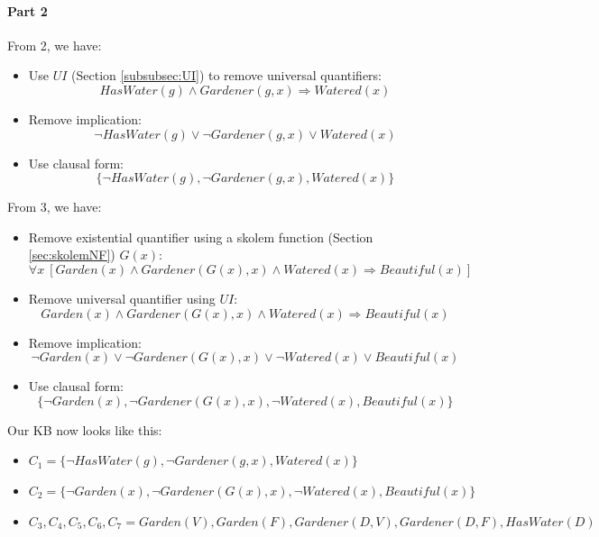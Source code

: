 \documentclass[10pt,a4paper]{article}
\begin{document}
\begin{itemize}
\paragraph{Part 2}

From 2, we have:
\begin{itemize}
\item Use $UI$ (Section \ref{subsubsec:UI}) to remove universal quantifiers:
\[ HasWater(g)\wedge Gardener(g,x)\Rightarrow Watered(x)\]
\item Remove implication:
\[\neg HasWater(g)\vee \neg Gardener(g,x)\vee Watered(x)\]
\item Use clausal form:
\[\lbrace \neg HasWater(g), \neg Gardener(g,x), Watered(x)\rbrace\]
\end{itemize}

From 3, we have:
\begin{itemize}
\item Remove existential quantifier using a skolem function (Section \ref{sec:skolemNF}) $G(x)$:
\[\forall x\ [Garden(x)\wedge  Gardener(G(x),x) \wedge Watered(x)\Rightarrow Beautiful(x)]\]
\item Remove universal quantifier using $UI$:
\[Garden(x)\wedge  Gardener(G(x),x) \wedge Watered(x)\Rightarrow Beautiful(x)\]
\item Remove implication:
\[\neg Garden(x)\vee \neg Gardener(G(x),x) \vee \neg Watered(x)\vee Beautiful(x)\]
\item Use clausal form:
\[\lbrace \neg Garden(x), \neg Gardener(G(x),x) , \neg Watered(x), Beautiful(x)\rbrace\]
\end{itemize}

Our KB now looks like this:
\begin{itemize}
\item $C_1=\lbrace \neg HasWater(g), \neg Gardener(g,x), Watered(x)\rbrace$
\item $C_2=\lbrace \neg Garden(x), \neg Gardener(G(x),x) , \neg Watered(x), Beautiful(x)\rbrace$
\item $C_3,C_4,C_5,C_6,C_7=Garden(V), Garden(F), Gardener(D,V), Gardener(D,F), HasWater(D)$
\end{itemize}




\end{itemize}
\end{document}
